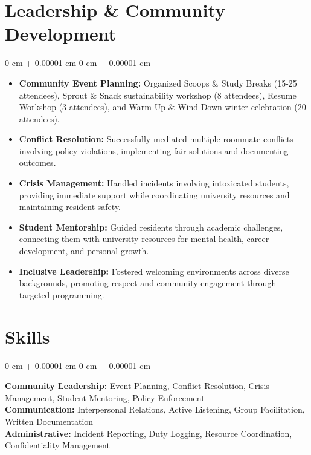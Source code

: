 \documentclass[10pt, letterpaper]{article}
\newenvironment{highlights}{
    \begin{itemize}[
        topsep=0.05 cm,
        parsep=0.05 cm,
        partopsep=0pt,
        itemsep=0pt,
        leftmargin=0 cm + 10pt
    ]
}{
    \end{itemize}
}
\newenvironment{onecolentry}{
    \begin{adjustwidth}{
        0 cm + 0.00001 cm
    }{
        0 cm + 0.00001 cm
    }
}{
    \end{adjustwidth}
}
\begin{document}
    \section{Leadership \& Community Development}

    \vspace{0.10 cm}
    \begin{onecolentry}
        \begin{highlights}
            \item \textbf{Community Event Planning:} Organized Scoops \& Study Breaks (15-25 attendees), Sprout \& Snack sustainability workshop (8 attendees), Resume Workshop (3 attendees), and Warm Up \& Wind Down winter celebration (20 attendees).
            \item \textbf{Conflict Resolution:} Successfully mediated multiple roommate conflicts involving policy violations, implementing fair solutions and documenting outcomes.
            \item \textbf{Crisis Management:} Handled incidents involving intoxicated students, providing immediate support while coordinating university resources and maintaining resident safety.
            \item \textbf{Student Mentorship:} Guided residents through academic challenges, connecting them with university resources for mental health, career development, and personal growth.
            \item \textbf{Inclusive Leadership:} Fostered welcoming environments across diverse backgrounds, promoting respect and community engagement through targeted programming.
        \end{highlights}
    \end{onecolentry}

    \section{Skills}
        \begin{onecolentry}
            \textbf{Community Leadership:} Event Planning, Conflict Resolution, Crisis Management, Student Mentoring, Policy Enforcement \\
            \textbf{Communication:} Interpersonal Relations, Active Listening, Group Facilitation, Written Documentation \\
            \textbf{Administrative:} Incident Reporting, Duty Logging, Resource Coordination, Confidentiality Management
        \end{onecolentry}
\end{document}
